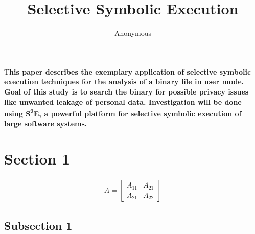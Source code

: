 \documentclass[DIV=calc, paper=a4, fontsize=11pt, twocolumn]{scrartcl}
\title{Selective Symbolic Execution}
\author{Anonymous}
\date{}
\newcommand{\sse}{S\textsuperscript{2}E\xspace}
\newcommand{\initial}[1]{
\lettrine[lines=3,lhang=0.3,nindent=0em]{
\color{tumblue}
{\textsf{#1}}}{}}
\begin{document}
\newcommand{\undefinedpagestyle}{}
\maketitle
\pagestyle{headings}


\initial{T}\textbf{his paper describes the exemplary application of selective symbolic execution techniques for the analysis of a binary file in user mode.
Goal of this study is to search the binary for possible privacy issues like unwanted leakage of personal data.
Investigation will be done using \sse, a powerful platform for selective symbolic execution of large software systems.
}












\iffalse %
\section*{Section 1}

\lipsum[1-3] %

\begin{align}
A =
\begin{bmatrix}
A_{11} & A_{21} \\
A_{21} & A_{22}
\end{bmatrix}
\end{align}

\lipsum[4] %


\subsection*{Subsection 1}
\end{document}
